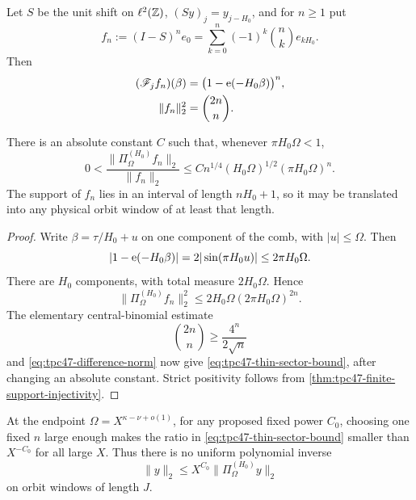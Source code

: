 Let \(S\) be the unit shift on \(\ell^2(\mathbb Z)\),
\((Sy)_j=y_{j-H_0}\), and for \(n\ge1\) put
\begin{equation}
 f_n:=(I-S)^n e_0
 =\sum_{k=0}^n(-1)^k\binom nk e_{kH_0}.
 \label{eq:tpc47-difference-witness}
\end{equation}
Then
\begin{align}
 (\mathscr F_jf_n)(\beta)
 &=\bigl(1-\mathrm e(-H_0\beta)\bigr)^n,
 \label{eq:tpc47-difference-transform}\\
 \|f_n\|_2^2&=\binom{2n}{n}.
 \label{eq:tpc47-difference-norm}
\end{align}

\begin{theorem}
\label{thm:tpc47-no-mass-lower-bound}
There is an absolute constant \(C\) such that, whenever
\(\pi H_0\Omega<1\),
\begin{equation}
 0<
 \frac{\|\Pi_{\Omega}^{(H_0)}f_n\|_2}{\|f_n\|_2}
 \le
 C n^{1/4}(H_0\Omega)^{1/2}
 (\pi H_0\Omega)^n.
 \label{eq:tpc47-thin-sector-bound}
\end{equation}
The support of \(f_n\) lies in an interval of length \(nH_0+1\), so
it may be translated into any physical orbit window of at least that
length.
\end{theorem}

\begin{proof}
Write \(\beta=\tau/H_0+u\) on one component of the comb, with
\(|u|\le\Omega\).  Then
\begin{equation}
 |1-\mathrm e(-H_0\beta)|
 =2|\sin(\pi H_0u)|
 \le2\pi H_0\Omega.
 \label{eq:tpc47-comb-witness-bound}
\end{equation}
There are \(H_0\) components, with total measure \(2H_0\Omega\).
Hence
\begin{equation}
 \|\Pi_{\Omega}^{(H_0)}f_n\|_2^2
 \le2H_0\Omega(2\pi H_0\Omega)^{2n}.
 \label{eq:tpc47-projected-witness-energy}
\end{equation}
The elementary central-binomial estimate
\begin{equation}
 \binom{2n}{n}\ge\frac{4^n}{2\sqrt n}
 \label{eq:tpc47-central-binomial-bound}
\end{equation}
and \eqref{eq:tpc47-difference-norm} now give
\eqref{eq:tpc47-thin-sector-bound}, after changing an absolute
constant.  Strict positivity follows from
\cref{thm:tpc47-finite-support-injectivity}.
\end{proof}

At the endpoint \(\Omega=X^{\kappa-\nu+o(1)}\), for any proposed
fixed power \(C_0\), choosing one fixed \(n\) large enough makes the
ratio in \eqref{eq:tpc47-thin-sector-bound} smaller than \(X^{-C_0}\)
for all large \(X\).  Thus there is no uniform polynomial inverse
\begin{equation}
 \|y\|_2\le X^{C_0}
 \|\Pi_{\Omega}^{(H_0)}y\|_2
 \label{eq:tpc47-forbidden-polynomial-inverse}
\end{equation}
on orbit windows of length \(J\).

